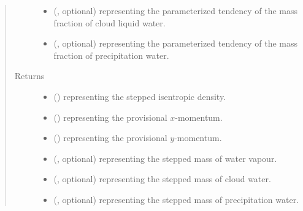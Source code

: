 \documentclass[letterpaper,10pt,english]{sphinxmanual}
\begin{document}
\begin{fulllineitems}
\begin{fulllineitems}
\begin{quote}
\begin{description}
\begin{itemize}
\item {} 
 (, optional) \textendash{}  representing the parameterized tendency of the mass fraction of cloud liquid water.

\item {} 
 (, optional) \textendash{}  representing the parameterized tendency of the mass fraction of precipitation water.

\end{itemize}

\item[{Returns}] \leavevmode
\begin{itemize}
\item {} 
 () \textendash{}  representing the stepped isentropic density.

\item {} 
 () \textendash{}  representing the provisional \(x\)-momentum.

\item {} 
 () \textendash{}  representing the provisional \(y\)-momentum.

\item {} 
 (, optional) \textendash{}  representing the stepped mass of water vapour.

\item {} 
 (, optional) \textendash{}  representing the stepped mass of cloud water.

\item {} 
 (, optional) \textendash{}  representing the stepped mass of precipitation water.

\end{itemize}


\end{description}\end{quote}

\end{fulllineitems}


\end{fulllineitems}
\end{document}
